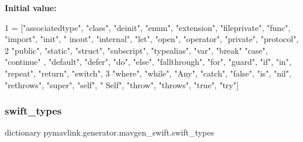{\bfseries Initial value\+:}
\begin{DoxyCode}
1 =  [\textcolor{stringliteral}{"associatedtype"}, \textcolor{stringliteral}{"class"}, \textcolor{stringliteral}{"deinit"}, \textcolor{stringliteral}{"enum"}, \textcolor{stringliteral}{"extension"}, \textcolor{stringliteral}{"fileprivate"}, \textcolor{stringliteral}{"func"}, \textcolor{stringliteral}{"import"}, \textcolor{stringliteral}{"init"}, \textcolor{stringliteral}{"
      inout"}, \textcolor{stringliteral}{"internal"}, \textcolor{stringliteral}{"let"}, \textcolor{stringliteral}{"open"}, \textcolor{stringliteral}{"operator"}, \textcolor{stringliteral}{"private"}, \textcolor{stringliteral}{"protocol"},
2                   \textcolor{stringliteral}{"public"}, \textcolor{stringliteral}{"static"}, \textcolor{stringliteral}{"struct"}, \textcolor{stringliteral}{"subscript"}, \textcolor{stringliteral}{"typealias"}, \textcolor{stringliteral}{"var"}, \textcolor{stringliteral}{"break"} \textcolor{stringliteral}{"case"}, \textcolor{stringliteral}{"continue"}
      , \textcolor{stringliteral}{"default"}, \textcolor{stringliteral}{"defer"}, \textcolor{stringliteral}{"do"}, \textcolor{stringliteral}{"else"}, \textcolor{stringliteral}{"fallthrough"}, \textcolor{stringliteral}{"for"}, \textcolor{stringliteral}{"guard"}, \textcolor{stringliteral}{"if"}, \textcolor{stringliteral}{"in"}, \textcolor{stringliteral}{"repeat"}, \textcolor{stringliteral}{"return"}, \textcolor{stringliteral}{"switch"},
3                   \textcolor{stringliteral}{"where"}, \textcolor{stringliteral}{"while"}, \textcolor{stringliteral}{"Any"}, \textcolor{stringliteral}{"catch"}, \textcolor{stringliteral}{"false"}, \textcolor{stringliteral}{"is"}, \textcolor{stringliteral}{"nil"}, \textcolor{stringliteral}{"rethrows"}, \textcolor{stringliteral}{"super"}, \textcolor{stringliteral}{"self"}, \textcolor{stringliteral}{"
      Self"}, \textcolor{stringliteral}{"throw"}, \textcolor{stringliteral}{"throws"}, \textcolor{stringliteral}{"true"}, \textcolor{stringliteral}{"try"}]
\end{DoxyCode}
\mbox{\label{namespacepymavlink_1_1generator_1_1mavgen__swift_aacf38ae82237859e3f36b253a9af5a6a}} 
\subsubsection{\texorpdfstring{swift\+\_\+types}{swift\_types}}
{\footnotesize\ttfamily dictionary pymavlink.\+generator.\+mavgen\+\_\+swift.\+swift\+\_\+types}

